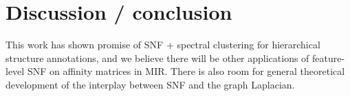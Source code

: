 \documentclass{article}
\begin{document}
\section{Discussion / conclusion}

This work has shown promise of SNF + spectral clustering for hierarchical structure annotations, and we believe there will be other applications of feature-level SNF on affinity matrices in MIR.  There is also room for general theoretical development of the interplay between SNF and the graph Laplacian.

\newpage


\end{document}
